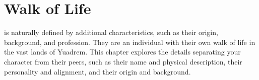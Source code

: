 \chapter{Walk of Life}

is naturally defined by additional characteristics, such as their origin, background, and profession.
They are an individual with their own walk of life in the vast lands of Yuadrem.
This chapter explores the details separating your character from their peers, such as their name and physical description, their personality and alignment, and their origin and background.




